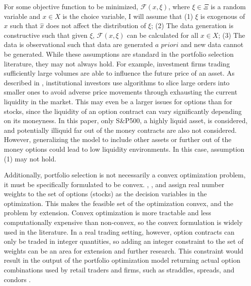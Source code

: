 For some objective function to be minimized, $\mathcal{F}(x, \xi)$, where $\xi \in \Xi$ is a random variable and $x \in X$ is the choice variable, I will assume that (1) $\xi$ is exogenous of $x$ such that $\hat{x}$ does not affect the distribution of $\xi$; (2) The data generation is constructive such that given $\xi$, $\mathcal{F}(x, \xi)$ can be calculated for all $x \in X$; (3) The data is observational such that data are generated $\textit{a priori}$ and new data cannot be generated. While these assumptions are standard in the portfolio selection literature, they may not always hold. For example, investment firms trading sufficiently large volumes are able to influence the future price of an asset. As described in \cite{gsell2008assessing}, institutional investors use algorithms to slice large orders into smaller ones to avoid adverse price movements through exhausting the current liquidity in the market. This may even be a larger issues for options than for stocks, since the liquidity of an option contract can vary significantly depending on its moneyness. In this paper, only S\&P500, a highly liquid asset, is considered, and potentially illiquid far out of the money contracts are also not considered. However, generalizing the model to include other assets or further out of the money options could lead to low liquidity environments. In this case, assumption (1) may not hold.


Additionally, portfolio selection is not necessarily a convex optimization problem, it must be specifically formulated to be convex. \cite{markowitz}, \cite{zhao2018markowitz}, and \cite{faias2017optimal} assign real number weights to the set of options (stocks) as the decision variables in the optimization. This makes the feasible set of the optimization convex, and the problem by extension. Convex optimization is more tractable and less computationally expensive than non-convex, so the convex formulation is widely used in the literature. In a real trading setting, however, option contracts can only be traded in integer quantities, so adding an integer constraint to the set of weights can be an area for extension and further research. This constraint would result in the output of the portfolio optimization model returning actual option combinations used by retail traders and firms, such as straddles, spreads, and condors \cite{chaput2003option}.


